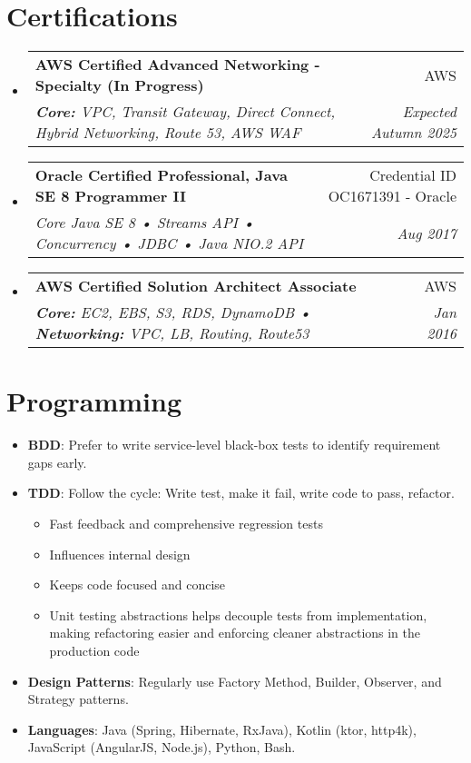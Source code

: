 \documentclass[letterpaper,11pt]{article}
\makeatletter
\newcommand{\resumeItem}[2]{
  \item\small{
    \textbf{#1}{: #2 \vspace{-2pt}}
  }
}
\newcommand{\resumeSubheading}[4]{
  \vspace{-1pt}\item
    \begin{tabular*}{0.97\textwidth}{l@{\extracolsep{\fill}}r}
      \textbf{#1} & #2 \\
      \textit{\small#3} & \textit{\small #4} \\
    \end{tabular*}\vspace{-5pt}
}
\newcommand{\resumeSubHeadingListStart}{\begin{itemize}[leftmargin=*]}
\newcommand{\resumeSubHeadingListEnd}{\end{itemize}}
\newcommand{\resumeItemListStart}{\begin{itemize}}
\newcommand{\resumeItemListEnd}{\end{itemize}\vspace{-5pt}}
\makeatother
\begin{document}
\section{Certifications}
    \resumeSubHeadingListStart
        \resumeSubheading
        {AWS Certified Advanced Networking - Specialty (In Progress)}{AWS}
        {\textbf{Core:} VPC, Transit Gateway, Direct Connect, Hybrid Networking, Route 53, AWS WAF}{Expected Autumn 2025}
        \resumeSubheading
        {Oracle Certified Professional, Java SE 8 Programmer II}{\small Credential ID OC1671391 - Oracle}
        {Core Java SE 8 • Streams API • Concurrency • JDBC • Java NIO.2 API}{Aug 2017}
        \resumeSubheading
        {AWS Certified Solution Architect Associate}{AWS}
        {\textbf{Core:} EC2, EBS, S3, RDS, DynamoDB • \textbf{Networking:} VPC, LB, Routing, Route53}{Jan 2016}
    \resumeSubHeadingListEnd
\section{Programming}
  \resumeSubHeadingListStart
    \resumeItem{BDD}
      {Prefer to write service-level black-box tests to identify requirement gaps early.}
    \resumeItem{TDD}
      {Follow the cycle: Write test, make it fail, write code to pass, refactor.}
    \resumeItemListStart
      \item Fast feedback and comprehensive regression tests
      \item Influences internal design
      \item Keeps code focused and concise
      \item Unit testing abstractions helps decouple tests from implementation, making refactoring easier and enforcing cleaner abstractions in the production code
    \resumeItemListEnd
    \resumeItem{Design Patterns}
      {Regularly use Factory Method, Builder, Observer, and Strategy patterns.}
    \resumeItem{Languages}
      {Java (Spring, Hibernate, RxJava), Kotlin (ktor, http4k), JavaScript (AngularJS, Node.js), Python, Bash.}
  \resumeSubHeadingListEnd

\end{document}
